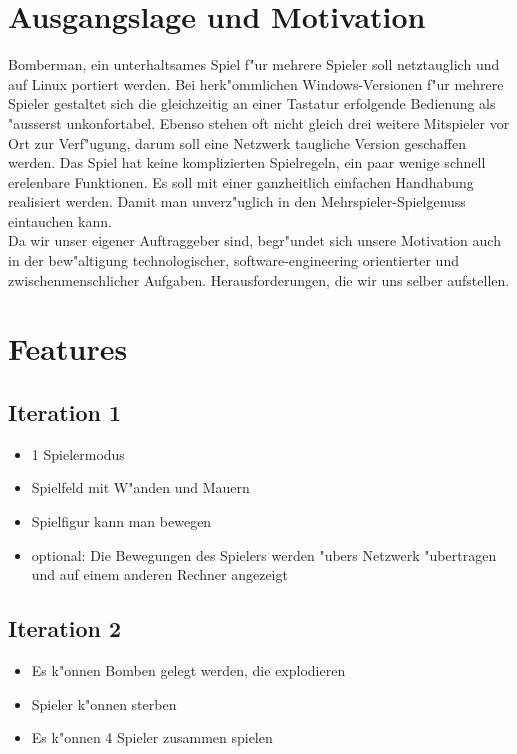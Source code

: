 \documentclass[10pt]{report}
\begin{document}
\chapter{Ausgangslage und Motivation}

Bomberman, ein unterhaltsames Spiel f"ur mehrere Spieler soll netztauglich und auf Linux portiert werden.
Bei herk"ommlichen Windows-Versionen f"ur mehrere Spieler gestaltet sich
die gleichzeitig an einer Tastatur erfolgende Bedienung als "ausserst unkonfortabel. Ebenso stehen oft nicht
gleich drei weitere Mitspieler vor Ort zur Verf"ugung, darum soll eine Netzwerk taugliche Version geschaffen werden.
Das Spiel hat keine komplizierten Spielregeln, ein paar wenige schnell erelenbare Funktionen.
Es soll mit einer ganzheitlich einfachen Handhabung realisiert werden. Damit man unverz"uglich in
den Mehrspieler-Spielgenuss eintauchen kann.
\\
Da wir unser eigener Auftraggeber sind, begr"undet sich unsere Motivation auch in der bew"altigung technologischer,
software-engineering orientierter und zwischenmenschlicher Aufgaben. Herausforderungen, die wir uns selber aufstellen.

\chapter{Features}
\section{Iteration 1}
\begin{itemize}{}{}
\item 1 Spielermodus
\item Spielfeld mit W"anden und Mauern
\item Spielfigur kann man bewegen
\item optional: Die Bewegungen des Spielers werden "ubers Netzwerk "ubertragen und auf einem anderen Rechner angezeigt
\end{itemize}

\section{Iteration 2}
\begin{itemize}{}{}
\item Es k"onnen Bomben gelegt werden, die explodieren
\item Spieler k"onnen sterben
\item Es k"onnen 4 Spieler zusammen spielen
\end{itemize}
\end{document}
